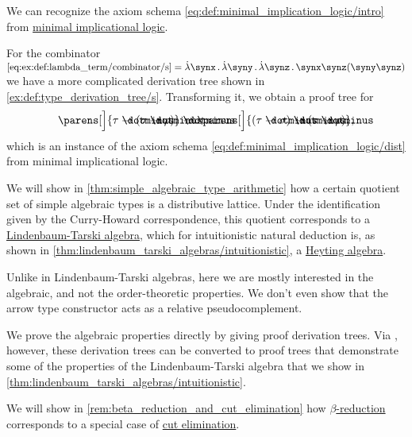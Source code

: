\begin{example}
\begin{thmenum}
    We can recognize the axiom schema \eqref{eq:def:minimal_implication_logic/intro} from \hyperref[def:minimal_implication_logic]{minimal implicational logic}.

    For the combinator \( \ref{eq:ex:def:lambda_term/combinator/s} = \qabs \synx \qabs \syny \qabs \synz \synx \synz (\syny \synz) \) we have a more complicated derivation tree shown in \cref{ex:def:type_derivation_tree/s}. Transforming it, we obtain a proof tree for
    \begin{equation*}
      \parens[\Big]{ \tau \synimplies (\sigma \synimplies \rho) } \synimplies \parens[\Big]{ (\tau \synimplies \sigma) \synimplies (\tau \synimplies \rho)},
    \end{equation*}
    which is an instance of the axiom schema \eqref{eq:def:minimal_implication_logic/dist} from minimal implicational logic.

     We will show in \cref{thm:simple_algebraic_type_arithmetic} how a certain quotient set of simple algebraic types is a distributive lattice. Under the identification given by the Curry-Howard correspondence, this quotient corresponds to a \hyperref[def:lindenbaum_tarski_algebra]{Lindenbaum-Tarski algebra}, which for intuitionistic natural deduction is, as shown in \cref{thm:lindenbaum_tarski_algebras/intuitionistic}, a \hyperref[def:heyting_algebra]{Heyting algebra}.

    Unlike in Lindenbaum-Tarski algebras, here we are mostly interested in the algebraic, and not the order-theoretic properties. We don't even show that the arrow type constructor acts as a relative pseudocomplement.

    We prove the algebraic properties directly by giving proof derivation trees. Via , however, these derivation trees can be converted to proof trees that demonstrate some of the properties of the Lindenbaum-Tarski algebra that we show in \cref{thm:lindenbaum_tarski_algebras/intuitionistic}.

     We will show in \cref{rem:beta_reduction_and_cut_elimination} how \hyperref[def:beta_eta_reduction]{\( \beta \)-reduction} corresponds to a special case of \hyperref[rem:sequent_calculus]{cut elimination}.
  \end{thmenum}
\end{example}
